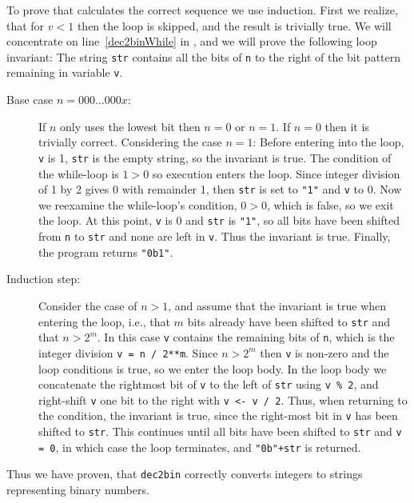 To prove that  calculates the correct sequence we use induction. First we realize, that for $v < 1$ then the  loop is skipped, and the result is trivially true. We will concentrate on line~\ref{dec2binWhile} in , and we will prove the following loop invariant: The string \lstinline{str} contains all the bits of \lstinline{n} to the right of the bit pattern remaining in variable \lstinline{v}.
\begin{description}
\item[Base case $n=000\ldots000x$:] If $n$ only uses the lowest bit then $n=0$ or $n=1$. If $n=0$ then it is trivially correct. Considering the case $n=1$: Before entering into the loop, \lstinline{v} is 1, \lstinline{str} is the empty string, so the invariant is true. The condition of the while-loop is $1>0$ so execution enters the loop. Since integer division of 1 by 2 gives 0 with remainder 1, then \lstinline{str} is set to \lstinline{"1"} and \lstinline{v} to 0. Now we reexamine the while-loop's condition, $0>0$, which is false, so we exit the loop. At this point, \lstinline{v} is 0 and \lstinline{str} is \lstinline{"1"}, so all bits have been shifted from \lstinline{n} to \lstinline{str} and none are left in \lstinline{v}. Thus the invariant is true. Finally, the program returns \lstinline{"0b1"}.
\item[Induction step:] Consider the case of $n>1$, and assume that the invariant is true when entering the loop, i.e., that $m$ bits already have been shifted to \lstinline{str} and that $n>2^m$. In this case \lstinline{v} contains the remaining bits of \lstinline{n}, which is the integer division \lstinline{v = n / 2**m}. Since $n>2^m$ then \lstinline{v} is non-zero and the loop conditions is true, so we enter the loop body. In the loop body we concatenate the rightmost bit of \lstinline{v} to the left of \lstinline{str} using \lstinline{v % 2}, %
and right-shift \lstinline{v} one bit to the right with \lstinline{v <- v / 2}. Thus, when returning to the condition, the invariant is true, since the right-most bit in \lstinline{v} has been shifted to \lstinline{str}. This continues until all bits have been shifted to \lstinline{str} and \lstinline{v = 0}, in which case the loop terminates, and \lstinline{"0b"+str} is returned.
\end{description}
Thus we have proven, that \lstinline{dec2bin} correctly converts integers to strings representing binary numbers.


